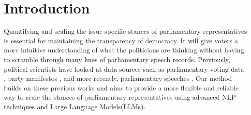 \documentclass[final,5p,times,twocolumn,authoryear]{elsarticle}
\begin{document}






\onecolumn
\tableofcontents
\newpage
\listoffigures
\newpage
\listoftables

\twocolumn
{}

\section{Introduction}
Quantifying and scaling the issue-specific stances of parliamentary representatives is essential for maintaining the transparency of democracy. It will give voters a more intuitive understanding of what the politicians are thinking without having to scramble through many lines of parliamentary speech records. Previously, political scientists have looked at data sources such as parliamentary voting data \citep{dw-nominate}, party manifestos \citep{CATALINAC_2018}, and more recently, parliamentary speeches \citep{Word-embeddings-for-analysis-of-ideological-placement}. Our method builds on these previous works and aims to provide a more flexible and reliable way to scale the stances of parliamentary representatives using advanced NLP techniques and Large Language Models(LLMs).
\end{document}
